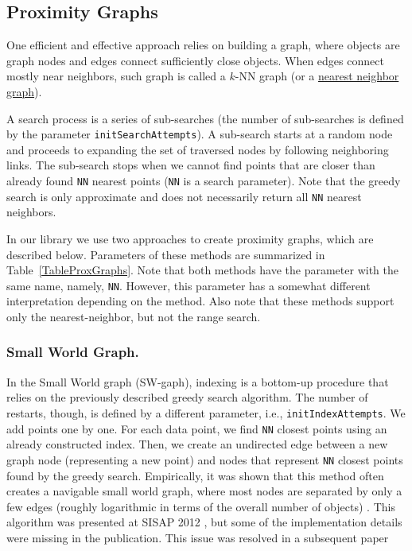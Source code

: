 \documentclass[runningheads,a4paper]{llncs}
\newcommand{\ttt}[1]{\texttt{#1}}
\newcommand{\knn}{$k$-NN }
\begin{document}
\subsection{Proximity Graphs} \label{SectionProxGraph}
One efficient and effective approach
relies on building a graph, where objects are graph nodes and edges connect sufficiently close objects.
When edges connect mostly near neighbors, such graph is called a \knn graph (or a \href{https://en.wikipedia.org/wiki/Nearest_neighbor_graph}{nearest neighbor graph}).

A search process is a series of sub-searches 
(the number of sub-searches is defined by the parameter \ttt{initSearchAttempts}).
A sub-search starts at a random node and proceeds to expanding the set of traversed nodes by following neighboring links. The sub-search stops when we cannot find points 
that are closer than already found \ttt{NN} nearest points (\ttt{NN} is a search parameter).
Note that the greedy search is only approximate and does not necessarily return all \ttt{NN} nearest neighbors.

In our library we use two approaches to create proximity graphs, which are described below.
Parameters of these methods are summarized in Table~\ref{TableProxGraphs}.
Note that both methods have the parameter with the same name, namely, \ttt{NN}.
However, this parameter has a somewhat different interpretation depending on the method.
Also note that these methods support only the nearest-neighbor, but not the range search.

\subsubsection{Small World Graph.} \label{SectionSWGraph}
In the Small World graph (SW-gaph),
indexing is a bottom-up procedure that relies on the previously described greedy search algorithm.  
The number of restarts, though, is defined by a different parameter, i.e., \ttt{initIndexAttempts}.
We add points one by one. For each data point, 
we find \ttt{NN} closest points using an already constructed index.
Then, we create an undirected edge between a new graph node (representing a new point) 
and nodes that represent \ttt{NN} closest points found by the greedy search. 
Empirically, it was shown that this method often creates a navigable small world graph, where most nodes are separated by only a few edges (roughly logarithmic in terms of the overall number of objects) \cite{malkov2012scalable}.
This algorithm was presented at SISAP 2012 \cite{malkov2012scalable},
but some of the implementation details were missing in the publication.
This issue was resolved in a subsequent paper \cite{malkov2014}
\end{document}
